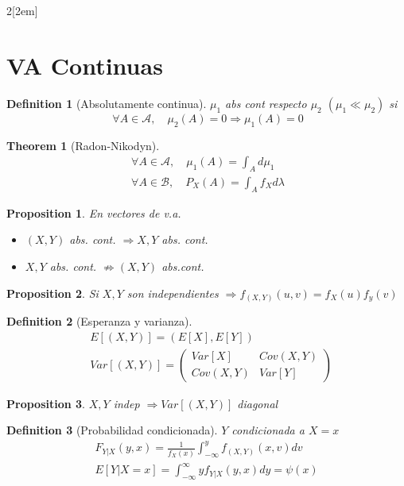 \documentclass{myclass}
\newtheorem*{theorem}{Theorem}
\newtheorem*{proposition}{Proposition}
\newtheorem*{definition}{Definition}
\begin{document}
\begin{multicols}{2}[\columnsep2em]
\section{VA Continuas}
\begin{definition}[Absolutamente continua] $\mu_1$ abs cont respecto $\mu_2$ $(\mu_1\ll \mu_2)$ si
\[
\ \forall A \in \mathcal{A}, \quad \mu_2(A) = 0 \Rightarrow \mu_1(A)=0
\] 
\end{definition}

\begin{theorem}[Radon-Nikodyn]
\begin{align*}
\ \forall A \in \mathcal{A}, \quad \mu_1(A) = \int_A d\mu_1 \\
\ \forall A \in \mathcal{B}, \quad P_X(A) = \int_A f_Xd\lambda
\end{align*}
\end{theorem}

\begin{proposition} En vectores de v.a.
\begin{itemize}[topsep=-6pt, itemsep=0pt]
  \item $(X, Y)$ abs. cont.  $\Rightarrow X, Y$ abs. cont.
  \item $X, Y$ abs. cont.  $\nRightarrow (X, Y)$ abs.cont.
\end{itemize} 
\end{proposition}

\begin{proposition}
Si $X, Y$ son independientes $\Rightarrow f_{(X, Y)}(u, v) = f_X(u)f_{y}(v)$  
\end{proposition}

\begin{definition}[Esperanza y varianza]
  \begin{align*}
  &E[(X, Y)] = (E[X], E[Y]) \\
  &Var[(X,Y)] = \begin{pmatrix} Var[X] & Cov(X, Y) \\ Cov(X, Y) & Var[Y] \end{pmatrix}
  \end{align*}
\end{definition}

\begin{proposition}
$X, Y$ indep $\Rightarrow Var[(X, Y)]$ diagonal 
\end{proposition}

\begin{definition}[Probabilidad condicionada] $Y$ condicionada a $X = x$ 
  \begin{align*}
F_{Y|X}(y, x) = \frac{1}{f_X(x)} \int_{-\infty}^y f_{(X,Y)}(x,v)dv\\
E[Y|X=x] = \int_{-\infty}^{\infty} yf_{Y|X}(y, x)dy = \psi (x)
  \end{align*}
\end{definition}


\end{multicols}
\end{document}
